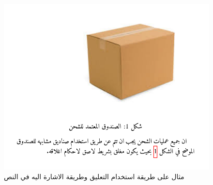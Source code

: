 \begin{mybox}
	\begin{figure}[H]
		\includegraphics[width=\linewidth]{figures/example2.png}
		\caption{\textarabic{مثال على طريقة استخدام التعليق وطريقة الاشارة اليه في النص}}
		\label{fig:startpython}
	\end{figure}
\end{mybox}